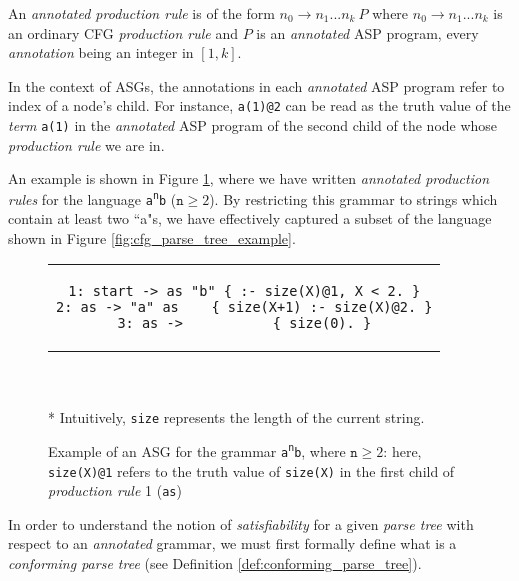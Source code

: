 \begin{definition}
\label{def:annotated_production_rule}
An \textit{annotated production rule} is of the form $n_0 \to n_1 ... n_k\ P$ where $n_0 \to n_1 ... n_k$ is an ordinary CFG \textit{production rule} and $P$ is an \textit{annotated} ASP program, every \textit{annotation} being an integer in $[1,k]$.
\end{definition}

\noindent
In the context of ASGs, the annotations in each \textit{annotated} ASP program refer to index of a node's child. For instance, \texttt{a(1)@2} can be read as the truth value of the \textit{term} \texttt{a(1)} in the \textit{annotated} ASP program of the second child of the node whose \textit{production rule} we are in.

An example is shown in Figure \ref{fig:asg_example}, where we have written \textit{annotated production rules} for the language \texttt{a\textsuperscript{n}b} ($\texttt{n} \ge 2$). By restricting this grammar to strings which contain at least two ``a"s, we have effectively captured a subset of the language shown in Figure \ref{fig:cfg_parse_tree_example}.

\begin{figure}[H]
\centering
\begin{tabular}{c}
\begin{lstlisting}[numbers=none, basicstyle=\ttfamily, columns=fixed, basewidth=0.45em]
1: start -> as "b" { :- size(X)@1, X < 2. }
2: as -> "a" as    { size(X+1) :- size(X)@2. }
3: as ->           { size(0). }
\end{lstlisting}
\end{tabular}
\\ \leavevmode \\ * Intuitively, \texttt{size} represents the length of the current string.
\caption{Example of an ASG for the grammar \texttt{a\textsuperscript{n}b}, where $\texttt{n} \ge 2$: here, \texttt{size(X)@1} refers to the truth value of \texttt{size(X)} in the first child of \textit{production rule} 1 (\texttt{as})}
\label{fig:asg_example}
\end{figure}

\noindent
In order to understand the notion of \textit{satisfiability} for a given \textit{parse tree} with respect to an \textit{annotated} grammar, we must first formally define what is a \textit{conforming parse tree} (see Definition \ref{def:conforming_parse_tree}).

